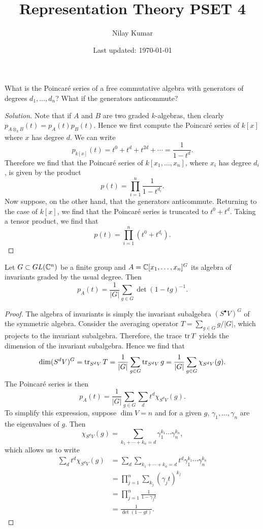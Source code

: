 \documentclass{../../mathnotes}
\title{Representation Theory PSET 4}
\author{Nilay Kumar}
\date{Last updated: \today}
\begin{document}
\maketitle

\begin{exc}
    What is the Poincar\'e series of a free commutative algebra with generators of degrees $d_1,\ldots, d_n$?
    What if the generators anticommute?
\end{exc}
\begin{proof}[Solution]
    Note that if $A$ and $B$ are two graded $k$-algebras, then clearly $p_{A\otimes_k B}(t)=p_A(t)p_B(t)$.
    Hence we first compute the Poincar\'e series of $k[x]$ where $x$ has degree $d$. We can write
    \[p_{k[x]}(t)=t^0+t^d+t^{2d}+\cdots=\frac{1}{1-t^d}.\]
    Therefore we find that the Poincar\'e series of $k[x_1,\ldots, x_n]$, where $x_i$ has degree $d_i$, is given
    by the product
    \[p(t)=\prod_{i=1}^n \frac{1}{1-t^{d_i}}.\]
    Now suppose, on the other hand, that the generators anticommute. Returning to the case of $k[x]$, we find
    that the Poincar\'e series is truncated to $t^0+t^d$. Taking a tensor product, we find that
    \[p(t)=\prod_{i=1}^n (t^0+t^{d_i}).\]
\end{proof}

\begin{exc}
    Let $G\subset GL(\mathbb{C}^n)$ be a finite group and $A=\mathbb{C}[x_1,\ldots, x_n]^G$ its algebra of invariants graded
    by the usual degree. Then
    \[p_A(t)=\frac{1}{|G|}\sum_{g\in G}\det(1-tg)^{-1}.\]
\end{exc}
\begin{proof}
    The algebra of invariants is simply the invariant subalgebra $(S^\bullet V)^G$ of the symmetric algebra.
    Consider the averaging operator $T=\sum_{g\in G}g/|G|$, which projects to the invariant subalgebra.
    Therefore, the trace $\operatorname{tr} T$ yields the dimension of the invariant subalgebra. Hence we find that
    \[\dim (S^dV)^G=\operatorname{tr}_{S^dV} T=\frac{1}{|G|}\sum_{g\in G}\operatorname{tr}_{S^dV}g=\frac{1}{|G|}\sum_{g\in G}\chi_{S^dV}(g).\]
    The Poincar\'e series is then
    \[p_A(t)=\frac{1}{|G|}\sum_{g\in G}\sum_dt^d\chi_{S^dV}(g).\]
    To simplify this expression, suppose $\dim V=n$ and for a given $g$, $\gamma_1,\ldots,\gamma_n$ are
    the eigenvalues of $g$. Then
    \[\chi_{S^dV}(g)=\sum_{k_1+\cdots+k_n=d}\gamma_1^{k_1}\cdots\gamma_n^{k_n},\]
    which allows us to write
    \begin{align*}
        \sum_dt^d\chi_{S^dV}(g)&=\sum_d\sum_{k_1+\cdots+k_n=d}t^d\gamma_1^{k_1}\cdots\gamma_n^{k_n}\\
        &=\prod_{j=1}^n\sum_{k_j}(\gamma_jt)^{k_j}\\
        &=\prod_{j=1}^n \frac{1}{1-\gamma_jt}\\
        &=\frac{1}{\det(1-g t)}.
    \end{align*}
\end{proof}
\end{document}
